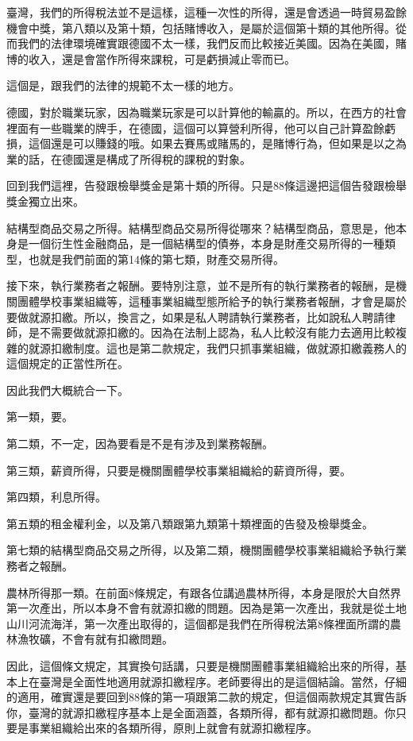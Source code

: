 \documentclass[]{ctexbook}
\begin{document}
臺灣，我們的所得稅法並不是這樣，這種一次性的所得，還是會透過一時貿易盈餘機會中獎，第八類以及第十類，包括賭博收入，是屬於這個第十類的其他所得。從而我們的法律環境確實跟德國不太一樣，我們反而比較接近美國。因為在美國，賭博的收入，還是會當作所得來課稅，可是虧損減止零而已。

這個是，跟我們的法律的規範不太一樣的地方。

德國，對於職業玩家，因為職業玩家是可以計算他的輸贏的。所以，在西方的社會裡面有一些職業的牌手，在德國，這個可以算營利所得，他可以自己計算盈餘虧損，這個還是可以賺錢的哦。如果去賽馬或賭馬的，是賭博行為，但如果是以之為業的話，在德國還是構成了所得稅的課稅的對象。

回到我們這裡，告發跟檢舉獎金是第十類的所得。只是88條這邊把這個告發跟檢舉獎金獨立出來。

結構型商品交易之所得。結構型商品交易所得從哪來？結構型商品，意思是，他本身是一個衍生性金融商品，是一個結構型的債券，本身是財產交易所得的一種類型，也就是我們前面的第14條的第七類，財產交易所得。

接下來，執行業務者之報酬。要特別注意，並不是所有的執行業務者的報酬，是機關團體學校事業組織等，這種事業組織型態所給予的執行業務者報酬，才會是屬於要做就源扣繳。所以，換言之，如果是私人聘請執行業務者，比如說私人聘請律師，是不需要做就源扣繳的。因為在法制上認為，私人比較沒有能力去適用比較複雜的就源扣繳制度。這也是第二款規定，我們只抓事業組織，做就源扣繳義務人的這個規定的正當性所在。

因此我們大概統合一下。

第一類，要。

第二類，不一定，因為要看是不是有涉及到業務報酬。

第三類，薪資所得，只要是機關團體學校事業組織給的薪資所得，要。

第四類，利息所得。

第五類的租金權利金，以及第八類跟第九類第十類裡面的告發及檢舉獎金。

第七類的結構型商品交易之所得，以及第二類，機關團體學校事業組織給予執行業務者之報酬。

農林所得那一類。在前面8條規定，有跟各位講過農林所得，本身是限於大自然界第一次產出，所以本身不會有就源扣繳的問題。因為是第一次產出，我就是從土地山川河流海洋，第一次產出取得的，這個都是我們在所得稅法第8條裡面所謂的農林漁牧礦，不會有就有扣繳問題。

因此，這個條文規定，其實換句話講，只要是機關團體事業組織給出來的所得，基本上在臺灣是全面性地適用就源扣繳程序。老師要得出的是這個結論。當然，仔細的適用，確實還是要回到88條的第一項跟第二款的規定，但這個兩款規定其實告訴你，臺灣的就源扣繳程序基本上是全面涵蓋，各類所得，都有就源扣繳問題。你只要是事業組織給出來的各類所得，原則上就會有就源扣繳程序。
\end{document}
